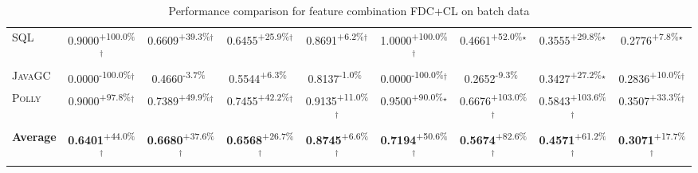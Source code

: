 \begin{table}[htbp]
\begin{tabular}{l|cccc|cccc}
\textsc{SQL} & \cellcolor{green!30}0.9000\textsuperscript{+100.0\%}$^\dagger$ & \cellcolor{green!30}0.6609\textsuperscript{+39.3\%}$^\dagger$ & \cellcolor{green!30}0.6455\textsuperscript{+25.9\%}$^\dagger$ & \cellcolor{green!30}0.8691\textsuperscript{+6.2\%}$^\dagger$ & \cellcolor{green!30}1.0000\textsuperscript{+100.0\%}$^\dagger$ & \cellcolor{green!30}0.4661\textsuperscript{+52.0\%}$^\star$ & \cellcolor{green!30}0.3555\textsuperscript{+29.8\%}$^\star$ & \cellcolor{green!30}0.2776\textsuperscript{+7.8\%}$^\star$ \\
\textsc{JavaGC} & \cellcolor{red!30}0.0000\textsuperscript{-100.0\%}$^\dagger$ & \cellcolor{red!30}0.4660\textsuperscript{-3.7\%}$^{\,\,\,}$ & \cellcolor{green!30}0.5544\textsuperscript{+6.3\%}$^{\,\,\,}$ & \cellcolor{red!30}0.8137\textsuperscript{-1.0\%}$^{\,\,\,}$ & \cellcolor{red!30}0.0000\textsuperscript{-100.0\%}$^\dagger$ & \cellcolor{red!30}0.2652\textsuperscript{-9.3\%}$^{\,\,\,}$ & \cellcolor{green!30}0.3427\textsuperscript{+27.2\%}$^\star$ & \cellcolor{green!30}0.2836\textsuperscript{+10.0\%}$^\dagger$ \\
\textsc{Polly} & \cellcolor{green!30}0.9000\textsuperscript{+97.8\%}$^\dagger$ & \cellcolor{green!30}0.7389\textsuperscript{+49.9\%}$^\dagger$ & \cellcolor{green!30}0.7455\textsuperscript{+42.2\%}$^\dagger$ & \cellcolor{green!30}0.9135\textsuperscript{+11.0\%}$^\dagger$ & \cellcolor{green!30}0.9500\textsuperscript{+90.0\%}$^\star$ & \cellcolor{green!30}0.6676\textsuperscript{+103.0\%}$^\dagger$ & \cellcolor{green!30}0.5843\textsuperscript{+103.6\%}$^\dagger$ & \cellcolor{green!30}0.3507\textsuperscript{+33.3\%}$^\dagger$ \\
\hline
\textbf{Average} & \cellcolor{green!30}\textbf{0.6401}\textsuperscript{+44.0\%}$^\dagger$ & \cellcolor{green!30}\textbf{0.6680}\textsuperscript{+37.6\%}$^\dagger$ & \cellcolor{green!30}\textbf{0.6568}\textsuperscript{+26.7\%}$^\dagger$ & \cellcolor{green!30}\textbf{0.8745}\textsuperscript{+6.6\%}$^\dagger$ & \cellcolor{green!30}\textbf{0.7194}\textsuperscript{+50.6\%}$^\dagger$ & \cellcolor{green!30}\textbf{0.5674}\textsuperscript{+82.6\%}$^\dagger$ & \cellcolor{green!30}\textbf{0.4571}\textsuperscript{+61.2\%}$^\dagger$ & \cellcolor{green!30}\textbf{0.3071}\textsuperscript{+17.7\%}$^\dagger$ \\
\hline
\end{tabular}
\caption{Performance comparison for feature combination FDC+CL on batch data}
\label{tab:combo_FDC_CL_performance_batch}
\end{table}